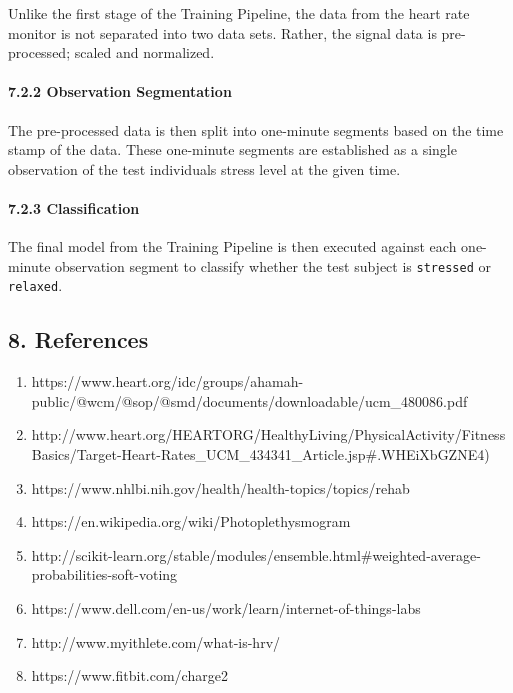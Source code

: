 \documentclass{scrreprt}
\begin{document}
Unlike the first stage of the Training Pipeline, the data from the heart
rate monitor is not separated into two data sets. Rather, the signal
data is pre-processed; scaled and normalized.

\paragraph{7.2.2 Observation
Segmentation}\label{observation-segmentation}

The pre-processed data is then split into one-minute segments based on
the time stamp of the data. These one-minute segments are established as
a single observation of the test individuals stress level at the given
time.

\paragraph{7.2.3 Classification}\label{classification}

The final model from the Training Pipeline is then executed against each
one-minute observation segment to classify whether the test subject is
\texttt{stressed} or \texttt{relaxed}.

\subsection{8. References}\label{references}

\begin{enumerate}
\def\labelenumi{\arabic{enumi}.}
\itemsep1pt\parskip0pt
\item
  https://www.heart.org/idc/groups/ahamah-public/@wcm/@sop/@smd/documents/downloadable/ucm\_480086.pdf
\item
  http://www.heart.org/HEARTORG/HealthyLiving/PhysicalActivity/FitnessBasics/Target-Heart-Rates\_UCM\_434341\_Article.jsp\#.WHEiXbGZNE4)
\item
  https://www.nhlbi.nih.gov/health/health-topics/topics/rehab
\item
  https://en.wikipedia.org/wiki/Photoplethysmogram
\item
  http://scikit-learn.org/stable/modules/ensemble.html\#weighted-average-probabilities-soft-voting
\item
  https://www.dell.com/en-us/work/learn/internet-of-things-labs
\item
  http://www.myithlete.com/what-is-hrv/
\item
  https://www.fitbit.com/charge2
\end{enumerate}


    
    
    
    
\end{document}

